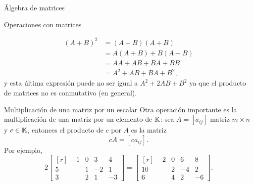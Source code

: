 \begin{chapter}{\'Algebra de matrices}
\begin{section}{Operaciones con matrices}
\begin{itemize}
                    \begin{align*}
                    (A+B)^2 &= (A+B)(A+B) \\&= A(A+B) + B(A+B) \\&= AA + AB + BA + BB \\&= A^2 + AB + BA + B^2,
                    \end{align*}
                    y  esta última expresión puede no ser  igual a $A^2 + 2AB + B^2$ ya que el producto de matrices no es conmutativo (en general). 
                \end{itemize}
        
        
        \begin{subsection}{Multiplicaci\'on de una matriz por un escalar} Otra operación importante es la multiplicación de una matriz por un elemento de $\mathbb K$: sea $A=[a_{ij}]$ matriz $m \times n$ y $c \in \mathbb K$,  entonces el producto de $c$ por $A$ es la matriz
            $$
            cA=[ca_{ij}].
            $$ 
        Por ejemplo, 
        $$
        2\begin{bmatrix*}[r]
        -1& 0& 3 & 4\\
        5& 1& -2 & 1\\
        3& 2& 1 & -3
        \end{bmatrix*} =
        \begin{bmatrix*}[r]
        -2& 0& 6& 8\\
        10& 2& -4 & 2\\
        6& 4& 2 & -6
        \end{bmatrix*}.
        $$
        

\end{subsection}
\end{section}
\end{chapter}
